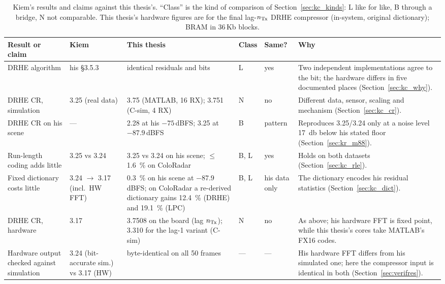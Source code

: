 \begin{table}[p]
\centering
\caption[Kiem's results against this thesis's]{Kiem's results and claims
against this thesis's. ``Class'' is the kind of comparison of
Section~\ref{sec:kc_kinds}: L like for like, B through a bridge, N not
comparable. This thesis's hardware figures are for the final lag-$n_{\mathrm{Tx}}$ DRHE
compressor (in-system, original dictionary); BRAM in 36\,Kb blocks.}
\label{tab:kc_all}
\scriptsize
\renewcommand{\arraystretch}{1.3}
\setlength{\tabcolsep}{3pt}
\begin{tabular}{@{}>{\raggedright}p{}>{\raggedright}p{}>{\raggedright}p{}>{\centering}p{}>{\centering}p{}>{\raggedright\arraybackslash}p{}@{}}
\toprule
Result or claim & Kiem & This thesis & Class & Same? & Why\\
\midrule
DRHE algorithm & his \S{}3.5.3 & identical residuals and bits & L & yes & Two independent implementations agree to the bit; the hardware differs in five documented places (Section~\ref{sec:kc_why}).\\
DRHE CR, simulation & 3.25 (real data) & 3.75 (MATLAB, 16 RX); 3.751 (C-sim, 4 RX) & N & no & Different data, sensor, scaling and mechanism (Section~\ref{sec:kc_cr}).\\
DRHE CR on his scene & --- & 2.28 at his $-75$\,dBFS; 3.25 at $-87.9$\,dBFS & B & pattern & Reproduces 3.25/3.24 only at a noise level \SI{17}{\decibel} below his stated floor (Section~\ref{sec:kr_m88}).\\
Run-length coding adds little & 3.25 vs 3.24 & 3.25 vs 3.24 on his scene; $\leq$\SI{1.6}{\percent} on ColoRadar & B, L & yes & Holds on both datasets (Section~\ref{sec:kc_rle}).\\
Fixed dictionary costs little & 3.24 $\to$ 3.17 (incl.\ HW FFT) & \SI{0.3}{\percent} on his scene at $-87.9$\,dBFS; on ColoRadar a re-derived dictionary gains \SI{12.4}{\percent} (DRHE) and \SI{19.1}{\percent} (LPC) & B, L & his data only & The dictionary encodes his residual statistics (Section~\ref{sec:kc_dict}).\\
DRHE CR, hardware & 3.17 & 3.7508 on the board (lag $n_{\mathrm{Tx}}$); 3.310 for the lag-1 variant (C-sim) & N & no & As above; his hardware FFT is fixed point, while this thesis's cores take MATLAB's FX16 codes.\\
Hardware output checked against simulation & 3.24 (bit-accurate sim.) vs 3.17 (HW) & byte-identical on all 50 frames & --- & --- & His hardware FFT differs from his simulated one; here the compressor input is identical in both (Section~\ref{sec:verifres}).\\

\end{tabular}
\end{table}
